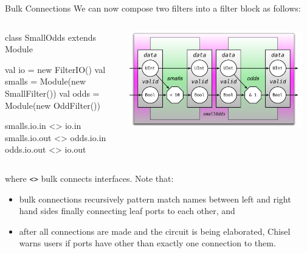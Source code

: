 \documentclass[xcolor=pdflatex,dvipsnames,table]{beamer}
\begin{document}
\begin{frame}[fragile]{Bulk Connections}
We can now compose two filters into a filter block as follows:

\begin{columns}

{
\begin{scala}
class SmallOdds extends Module { 
  val io     = new FilterIO()
  val smalls = Module(new SmallFilter())
  val odds   = Module(new OddFilter())

  smalls.io.in  <> io.in
  smalls.io.out <> odds.io.in
  odds.io.out   <> io.out
}
\end{scala}
}


\begin{center}
\includegraphics[width=0.95\textwidth]{figs/small-odds.pdf} 
\end{center}

\end{columns}

\noindent
where \verb+<>+ bulk connects interfaces.  Note that:
\begin{itemize}
\item bulk connections recursively pattern match names between left and right hand sides finally connecting leaf ports to each other, and
\item after all connections are made and the circuit is being elaborated,
Chisel warns users if ports have other than exactly one connection to them.
\end{itemize}
\end{frame}
\end{document}
